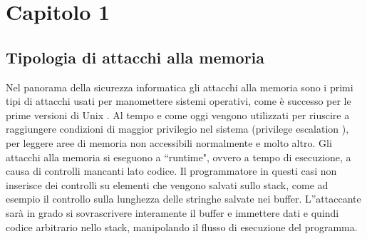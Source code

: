 

\chapter*{Capitolo 1}

\section*{Tipologia di attacchi alla memoria}

Nel panorama della sicurezza informatica gli attacchi alla memoria sono i primi tipi di attacchi usati per manomettere sistemi operativi, come è successo per le prime versioni di Unix \cite{Radware}. Al tempo e come oggi vengono utilizzati per riuscire a raggiungere condizioni di maggior privilegio nel sistema (privilege escalation \cite{Cynet}), per leggere aree di memoria non accessibili normalmente e molto altro.
Gli attacchi alla memoria si eseguono a ``runtime", ovvero a tempo di esecuzione, a causa di controlli mancanti lato codice. Il programmatore in questi casi non inserisce dei controlli su elementi che vengono salvati sullo stack, come ad esempio il controllo sulla lunghezza delle stringhe salvate nei buffer. L''attaccante sarà in grado si sovrascrivere interamente il buffer e immettere dati e quindi codice arbitrario nello stack, manipolando il flusso di esecuzione del programma.


